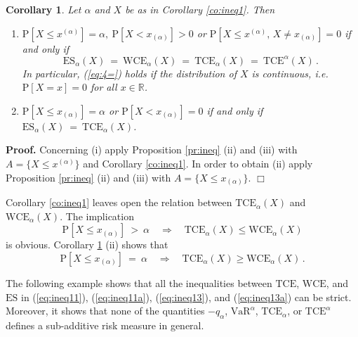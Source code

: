 \documentclass[11pt,a4paper,leqno]{article}
\newtheorem{corollary}[theorem]{Corollary}
\begin{document}
\begin{corollary}
  \label{co:ineq2}
Let $\alpha$ and $X$ be as in Corollary \ref{co:ineq1}. Then
\begin{enumerate}
%
\item $\mathrm{P}[X \le x^{(\alpha)}]  =
  \alpha,\ \mathrm{P}[X < x_{(\alpha)}] > 0$ or
$\mathrm{P}[X \le x^{(\alpha)},\, X \not= x_{(\alpha)}] = 0$   
 \quad
if and only if
\begin{equation}\label{eq:4=}
\mathrm{ES}_\alpha(X) \ = \ \mathrm{WCE}_\alpha(X) \ = \ \mathrm{TCE}_\alpha(X)\ = \ \mathrm{TCE}^\alpha(X)\,.
\end{equation}
In particular,  (\ref{eq:4=}) holds if the distribution of $X$ is continuous,
i.e.
$\mathrm{P}[X = x] = 0$ for all $x\in\mathbb{R}$.
%
\item $\mathrm{P}[X \le x_{(\alpha)}] = \alpha$ or $\mathrm{P}[X <
  x_{(\alpha)}] = 0$ \quad if and only if
\quad $\mathrm{ES}_\alpha(X) \ = \ \mathrm{TCE}_\alpha(X)$.
\end{enumerate}
\end{corollary}
%
\textbf{Proof.} 
Concerning (i)  apply Proposition \ref{pr:ineq} (ii) and (iii) with $A = \{ X
\le x^{(\alpha)}\}$
and Corollary \ref{co:ineq1}.
In order to obtain (ii) apply  Proposition \ref{pr:ineq} (ii) and (iii) with $A = \{ X \le x_{(\alpha)}\}$.
\hfill $\Box$

Corollary \ref{co:ineq1} leaves open the relation between $\mathrm{TCE}_\alpha(X)$ and $\mathrm{WCE}_\alpha(X)$.
The implication
\begin{equation}
\mathrm{P}[X \le x_{(\alpha)}]\ >\ \alpha\quad \Rightarrow\quad \mathrm{TCE}_\alpha(X) \le \mathrm{WCE}_\alpha(X)
  \label{eq:ineq13}
\end{equation}
is obvious. Corollary \ref{co:ineq2} (ii) shows that
\begin{equation}
\mathrm{P}[X \le x_{(\alpha)}]\ =\ \alpha\quad \Rightarrow\quad \mathrm{TCE}_\alpha(X) \ge \mathrm{WCE}_\alpha(X)\,.
  \label{eq:ineq13a}
\end{equation}

The following example shows that all the inequalities between $\mathrm{TCE}$, $\mathrm{WCE}$, and $\mathrm{ES}$
in (\ref{eq:ineq11}), (\ref{eq:ineq11a}), (\ref{eq:ineq13}), and (\ref{eq:ineq13a}) can be strict.
Moreover, it shows that none of the quantities $- q_{\alpha}$, $\mathrm{VaR}^{\alpha}$, $\mathrm{TCE}_\alpha$, or
$\mathrm{TCE}^\alpha$ defines a sub-additive risk measure in general.
\end{document}
